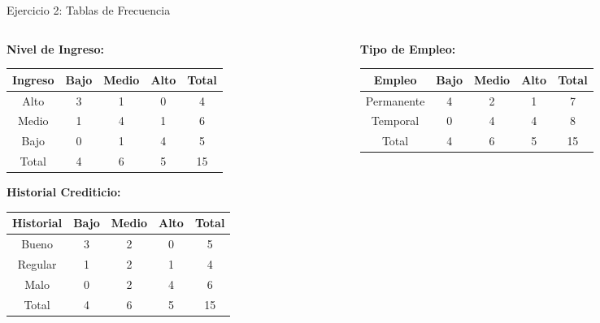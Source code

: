 \documentclass{beamer}
\begin{document}
\begin{frame}{Ejercicio 2: Tablas de Frecuencia}
    \begin{columns}
        \begin{column}{0.48\textwidth}
            \tiny
            \textbf{Nivel de Ingreso:}
            \begin{tabular}{ccccc}
                \toprule
                Ingreso & Bajo & Medio & Alto & Total \\
                \midrule
                Alto & 3 & 1 & 0 & 4 \\
                Medio & 1 & 4 & 1 & 6 \\
                Bajo & 0 & 1 & 4 & 5 \\
                \midrule
                Total & 4 & 6 & 5 & 15 \\
                \bottomrule
            \end{tabular}

            \vspace{0.3cm}

            \textbf{Historial Crediticio:}
            \begin{tabular}{ccccc}
                \toprule
                Historial & Bajo & Medio & Alto & Total \\
                \midrule
                Bueno & 3 & 2 & 0 & 5 \\
                Regular & 1 & 2 & 1 & 4 \\
                Malo & 0 & 2 & 4 & 6 \\
                \midrule
                Total & 4 & 6 & 5 & 15 \\
                \bottomrule
            \end{tabular}
        \end{column}
        \begin{column}{0.48\textwidth}
            \tiny
            \textbf{Tipo de Empleo:}
            \begin{tabular}{ccccc}
                \toprule
                Empleo & Bajo & Medio & Alto & Total \\
                \midrule
                Permanente & 4 & 2 & 1 & 7 \\
                Temporal & 0 & 4 & 4 & 8 \\
                \midrule
                Total & 4 & 6 & 5 & 15 \\
                \bottomrule
            \end{tabular}


\end{column}
\end{columns}
\end{frame}
\end{document}

